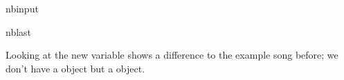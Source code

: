 \documentclass[letterpaper,10pt,english]{sphinxmanual}
\begin{document}
\begin{sphinxuseclass}{nbinput}
\begin{sphinxuseclass}{nblast}
{
\begin{sphinxVerbatim}[commandchars=\\\{\}]
\llap{\color{nbsphinxin}[13]:\,\hspace{\fboxrule}\hspace{\fboxsep}}  \PYG{p}{[}\PYG{p}{]}
\end{sphinxVerbatim}
}

\end{sphinxuseclass}
\end{sphinxuseclass}
\sphinxAtStartPar
Looking at the new variable  shows a difference to the example song before; we don’t have a  object but a  object.
\end{document}
